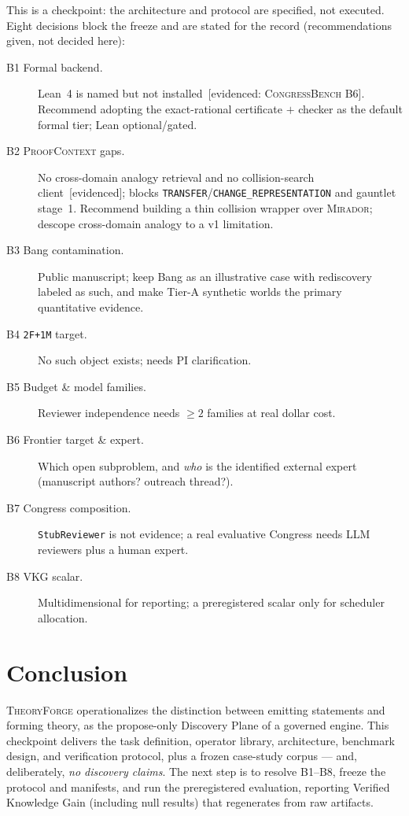 \documentclass[11pt]{amsart}
\theoremstyle{definition}
\theoremstyle{remark}
\newcommand{\mirador}{\textsc{Mirador}}
\newcommand{\pc}{\textsc{ProofContext}}
\newcommand{\cb}{\textsc{CongressBench}}
\newcommand{\tf}{\textsc{TheoryForge}}
\newcommand{\op}[1]{\texttt{#1}}
\newcommand{\ev}[1]{\textsf{\footnotesize[#1]}} %
\begin{document}
This is a checkpoint: the architecture and protocol are specified, not executed.
Eight decisions block the freeze and are stated for the record (recommendations
given, not decided here):
\begin{description}
\item[B1 Formal backend.] Lean~4 is named but not installed~\ev{evidenced: \cb{}
B6}. Recommend adopting the exact-rational certificate $+$ checker as the default
formal tier; Lean optional/gated.
\item[B2 \pc{} gaps.] No cross-domain analogy retrieval and no collision-search
client~\ev{evidenced}; blocks \op{TRANSFER}/\op{CHANGE\_REPRESENTATION} and
gauntlet stage~1. Recommend building a thin collision wrapper over \mirador{};
descope cross-domain analogy to a v1 limitation.
\item[B3 Bang contamination.] Public manuscript; keep Bang as an illustrative
case with rediscovery labeled as such, and make Tier-A synthetic worlds the
primary quantitative evidence.
\item[B4 \texttt{2F+1M} target.] No such object exists; needs PI clarification.
\item[B5 Budget \& model families.] Reviewer independence needs $\ge 2$ families
at real dollar cost.
\item[B6 Frontier target \& expert.] Which open subproblem, and \emph{who} is the
identified external expert (manuscript authors? outreach thread?).
\item[B7 Congress composition.] \texttt{StubReviewer} is not evidence; a real
evaluative Congress needs LLM reviewers plus a human expert.
\item[B8 VKG scalar.] Multidimensional for reporting; a preregistered scalar only
for scheduler allocation.
\end{description}

\section{Conclusion}\label{sec:conclusion}

\tf{} operationalizes the distinction between emitting statements and forming
theory, as the propose-only Discovery Plane of a governed engine. This checkpoint
delivers the task definition, operator library, architecture, benchmark design,
and verification protocol, plus a frozen case-study corpus --- and, deliberately,
\emph{no discovery claims}. The next step is to resolve B1--B8, freeze the
protocol and manifests, and run the preregistered evaluation, reporting Verified
Knowledge Gain (including null results) that regenerates from raw artifacts.
\end{document}
